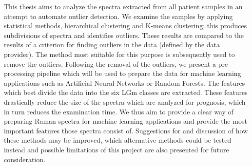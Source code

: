 This thesis aims to analyze the spectra extracted from all patient samples in an attempt to automate outlier detection.%
We examine the samples by applying statistical methods, hierarchical clustering and K-means clustering; this produces subdivisions of spectra and identifies outliers. These results are compared to the results of a criterion for finding outliers in the data (defined by the data provider). The method most suitable for this purpose is subsequently used to remove the outliers. Following the removal of the outliers, we present a pre-processing pipeline which will be used to prepare the data for machine learning applications such as Artificial Neural Networks or Random Forests. The features which best divide the data into the six LGm classes are extracted. These features drastically reduce the size of the spectra which are analyzed for prognosis, which in turn reduces the examination time. We thus aim to provide a clear way of preparing Raman spectra for machine learning applications and provide the most important features those spectra consist of. Suggestions for and discussion of how these methods may be improved, which alternative methods could be tested instead and possible limitations of this project are also presented for future consideration.

